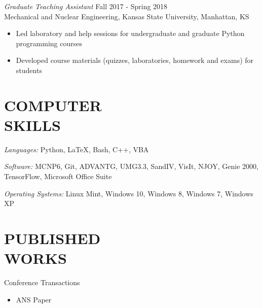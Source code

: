 \documentclass[margin, 10pt]{res} %
\begin{document}
\begin{resume}
{\sl Graduate Teaching Assistant} \hfill Fall 2017 - Spring 2018 \\
Mechanical and Nuclear Engineering, Kansas State University, Manhattan, KS \\
\begin{itemize} \itemsep -2pt %
    \item Led laboratory and help sessions for undergraduate and graduate Python programming courses
    \item Developed course materials (quizzes, laboratories, homework and exams) for students
\end{itemize}


\section{COMPUTER \\ SKILLS} 

{\sl Languages:}
Python, \LaTeX, Bash, C++, VBA

{\sl Software:}
MCNP6, Git, ADVANTG, UMG3.3, SandIV, VisIt, NJOY, Genie 2000, TensorFlow, Microsoft Office Suite

{\sl Operating Systems:}
Linux Mint, Windows 10, Windows 8, Windows 7, Windows XP

\section{PUBLISHED \\ WORKS}
Conference Transactions
\begin{itemize}
\item ANS Paper
\end{itemize}


\end{resume}
\end{document}
